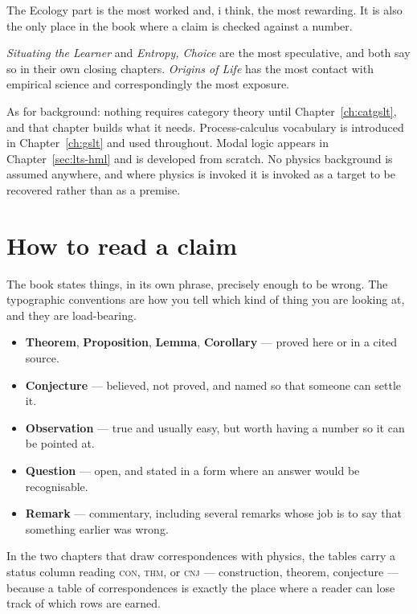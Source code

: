The Ecology part is the most worked and, i think, the most
rewarding.
It is also the only place in the book where a claim is checked
against a number.

\emph{Situating the Learner} and \emph{Entropy, Choice} are the
most speculative, and both say so in their own closing chapters.
\emph{Origins of Life} has the most contact with empirical
science and correspondingly the most exposure.

As for background: nothing requires category theory until
Chapter~\ref{ch:catgslt}, and that chapter builds what it needs.
Process-calculus vocabulary is introduced in
Chapter~\ref{ch:gslt} and used throughout.
Modal logic appears in Chapter~\ref{sec:lts-hml} and is developed
from scratch.
No physics background is assumed anywhere, and where physics is
invoked it is invoked as a target to be recovered rather than as a
premise.

\section*{How to read a claim}

The book states things, in its own phrase, precisely enough to be
wrong.
The typographic conventions are how you tell which kind of thing
you are looking at, and they are load-bearing.

\begin{itemize}[leftmargin=1.6em, itemsep=3pt]
\item \textbf{Theorem}, \textbf{Proposition}, \textbf{Lemma},
      \textbf{Corollary} --- proved here or in a cited source.
\item \textbf{Conjecture} --- believed, not proved, and named so
      that someone can settle it.
\item \textbf{Observation} --- true and usually easy, but worth
      having a number so it can be pointed at.
\item \textbf{Question} --- open, and stated in a form where an
      answer would be recognisable.
\item \textbf{Remark} --- commentary, including several remarks
      whose job is to say that something earlier was wrong.
\end{itemize}

\noindent
In the two chapters that draw correspondences with physics, the
tables carry a status column reading \textsc{con}, \textsc{thm}, or
\textsc{cnj} --- construction, theorem, conjecture --- because a
table of correspondences is exactly the place where a reader can
lose track of which rows are earned.

